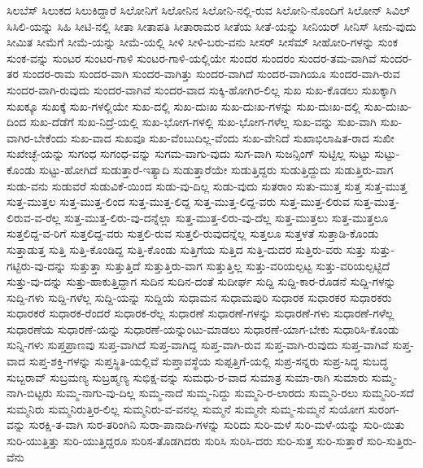 {ಸಿಲಬೆಸ್
ಸಿಲುಕದ
ಸಿಲುಕಿದ್ದಾರೆ
ಸಿಲೋನಿಗೆ
ಸಿಲೋನಿನ
ಸಿಲೋನಿ-ನಲ್ಲಿ-ರುವ
ಸಿಲೋನಿ-ನೊಂದಿಗೆ
ಸಿಲೋನ್
ಸಿವಿಲ್
ಸಿಸಿಲಿ-ಯನ್ನು
ಸಿಹಿ
ಸೀಟಿ-ನಲ್ಲಿ
ಸೀತಾ
ಸೀತಾಪತಿ
ಸೀತಾರಾಮರ
ಸೀತೆಯ
ಸೀತೆ-ಯನ್ನು
ಸೀನಿಯರ್
ಸೀನಿಸ್
ಸೀನು-ವುದು
ಸೀಮಿತ
ಸೀಮೆಗೆ
ಸೀಮೆ-ಯನ್ನು
ಸೀಮೆ-ಯಲ್ಲಿ
ಸೀಳಿ
ಸೀಳಿ-ಬರು-ವನು
ಸೀಸರ್
ಸೀಸೆಮ್
ಸೀಹೋರಿ-ಗಳನ್ನು
ಸುಂಕ
ಸುಂಕ-ವನ್ನು
ಸುಂಟರ
ಸುಂಟರ-ಗಾಳಿ
ಸುಂಟರ-ಗಾಳಿ-ಯಲ್ಲಿಯೇ
ಸುಂದರ
ಸುಂದರಂ
ಸುಂದರ-ತಮ-ವಾಗಿವೆ
ಸುಂದರ-ತರ
ಸುಂದರ-ರಾಮ
ಸುಂದರ-ವಾಗಿ
ಸುಂದರ-ವಾಗಿತ್ತು
ಸುಂದರ-ವಾಗಿದೆ
ಸುಂದರ-ವಾಗಿಯೂ
ಸುಂದರ-ವಾಗಿ-ರುವ
ಸುಂದರ-ವಾಗಿ-ರುವುದು
ಸುಂದರ-ವಾಗಿವೆ
ಸುಂದರ-ವಾದ
ಸುಕ್ಕಿ-ಹೋಗಿರ-ಲಿಲ್ಲ
ಸುಖ
ಸುಖ-ಕೊಡಲು
ಸುಖಕ್ಕಾಗಿ
ಸುಖಕ್ಕೂ
ಸುಖಕ್ಕೆ
ಸುಖ-ಗಳಲ್ಲಿಯೇ
ಸುಖ-ದಲ್ಲಿ
ಸುಖ-ದುಃಖ
ಸುಖ-ದುಃಖ-ಗಳನ್ನು
ಸುಖ-ದುಃಖ-ದಲ್ಲಿ
ಸುಖ-ದುಃಖ-ದಿಂದ
ಸುಖ-ದೆಡೆಗೆ
ಸುಖ-ನಿದ್ರೆ-ಯಲ್ಲಿ
ಸುಖ-ಭೋಗ-ಗಳಲ್ಲಿ
ಸುಖ-ಭೋಗ-ಗಳೆಲ್ಲ
ಸುಖ-ವನ್ನು
ಸುಖ-ವಾಗಿ
ಸುಖ-ವಾಗಿರ-ಬೇಕೆಂದು
ಸುಖ-ವಾದ
ಸುಖವೂ
ಸುಖ-ವೆಂಬುದಿಲ್ಲ-ವೆಂದು
ಸುಖ-ವೇನಿದೆ
ಸುಖಾಭಿಲಾಷಿತ-ರಾದ
ಸುಖೀ
ಸುಖೇಚ್ಛೆ-ಯನ್ನು
ಸುಗಂಧ
ಸುಗಂಧ-ವನ್ನು
ಸುಗಮ-ವಾಗು-ವುದು
ಸುಗ-ವಾಗಿ
ಸುಜನ್ಸಿಂಗ್
ಸುಟ್ಟಿಲ್ಲ
ಸುಟ್ಟು
ಸುಟ್ಟು-ಕೊಂಡು
ಸುಟ್ಟು-ಹೋಗಿದೆ
ಸುಡುತ್ತಾರೆ-ಇತ್ಯಾದಿ
ಸುಡುತ್ತಾರೆಯೇ
ಸುಡುತ್ತಿದ್ದರು
ಸುಡುತ್ತಿದ್ದುದು
ಸುಡುತ್ತಿರು-ವಾಗ
ಸುಡು-ವನು
ಸುಡುವರೆ
ಸುಡುವಿಕೆ-ಯಿಂದ
ಸುಡು-ವು-ದಿಲ್ಲ
ಸುಡು-ವುದು
ಸುತರಾಂ
ಸುತು-ಮುತ್ತ
ಸುತ್ತ
ಸುತ್ತ-ಮುತ್ತ
ಸುತ್ತ-ಮುತ್ತಲ
ಸುತ್ತ-ಮುತ್ತ-ಲಿಂದ
ಸುತ್ತ-ಮುತ್ತ-ಲಿದ್ದ
ಸುತ್ತ-ಮುತ್ತ-ಲಿದ್ದ-ವರು
ಸುತ್ತ-ಮುತ್ತ-ಲಿರುವ
ಸುತ್ತ-ಮುತ್ತ-ಲಿರುವ-ವ-ರೆಲ್ಲ
ಸುತ್ತ-ಮುತ್ತ-ಲಿರು-ವು-ದನ್ನೆಲ್ಲಾ
ಸುತ್ತ-ಮುತ್ತ-ಲಿರು-ವು-ದೆಲ್ಲ
ಸುತ್ತ-ಮುತ್ತಲು
ಸುತ್ತ-ಮುತ್ತಲೂ
ಸುತ್ತಲಿದ್ದ-ವ-ರಿಗೆ
ಸುತ್ತಲಿದ್ದ-ವರು
ಸುತ್ತಲಿ-ರುವ
ಸುತ್ತಲಿ-ರುವುದನ್ನೆಲ್ಲ
ಸುತ್ತಲೂ
ಸುತ್ತಳತೆ
ಸುತ್ತಾಡಿ-ಕೊಂಡು
ಸುತ್ತಾಡುತ್ತ
ಸುತ್ತಿ
ಸುತ್ತಿ-ಕೊಂಡಿದ್ದ
ಸುತ್ತಿ-ಕೊಂಡು
ಸುತ್ತಿಗೆಯ
ಸುತ್ತಿದ
ಸುತ್ತಿ-ದುದರ
ಸುತ್ತಿರು-ವರು
ಸುತ್ತು
ಸುತ್ತು-ಗಟ್ಟಿರು-ವು-ದನ್ನು
ಸುತ್ತುತ್ತಾ
ಸುತ್ತುತ್ತಿದೆ
ಸುತ್ತುತ್ತಿರು-ವಾಗ
ಸುತ್ತುತ್ತಿಲ್ಲ
ಸುತ್ತು-ವರಿಯಲ್ಪಟ್ಟ
ಸುತ್ತು-ವರಿಯಲ್ಪಟ್ಟಿದೆ
ಸುತ್ತು-ವು-ದನ್ನು
ಸುತ್ತು-ಹಾಕುತ್ತಿದ್ದಾಗ
ಸುದಿನ
ಸುದಿನ-ದಂತೆ
ಸುದೀರ್ಘ
ಸುದ್ದಿ
ಸುದ್ದಿ-ಕಾರ-ರೊಡನೆ
ಸುದ್ದಿ-ಗಳನ್ನು
ಸುದ್ದಿ-ಗಳು
ಸುದ್ದಿ-ಗಳೆಲ್ಲ
ಸುದ್ದಿ-ಯನ್ನು
ಸುದ್ದಿಯೆ
ಸುಧಾಮನ
ಸುಧಾಮಪುರಿ
ಸುಧಾರಕ
ಸುಧಾರಕರ
ಸುಧಾರಕರು
ಸುಧಾರಕರೆ
ಸುಧಾರಕ-ರೆಂದರೆ
ಸುಧಾರಕ-ರೆಲ್ಲ
ಸುಧಾರಣೆ
ಸುಧಾರಣೆ-ಗಳನ್ನು
ಸುಧಾರಣೆ-ಗಳು
ಸುಧಾರಣೆ-ಗಳೆಲ್ಲ
ಸುಧಾರಣೆಯ
ಸುಧಾರಣೆ-ಯನ್ನು
ಸುಧಾರಣೆ-ಯನ್ನುಂಟು-ಮಾಡಲು
ಸುಧಾರಣೆ-ಯಾಗ-ಬೇಕು
ಸುಧಾರಿಸಿ-ಕೊಂಡು
ಸುನ್ನಿ-ಗಳು
ಸುಪ್ತಪ್ರಾಣವು
ಸುಪ್ತ-ವಾಗಿದೆ
ಸುಪ್ತ-ವಾಗಿದ್ದ
ಸುಪ್ತ-ವಾಗಿ-ರುವ
ಸುಪ್ತ-ವಾಗಿ-ರುವುದು
ಸುಪ್ತ-ವಾಗಿವೆ
ಸುಪ್ತ-ವಾದ
ಸುಪ್ತ-ಶಕ್ತಿ-ಗಳನ್ನು
ಸುಪ್ತಸ್ಥಿತಿ-ಯಲ್ಲಿವೆ
ಸುಪ್ತಾವಸ್ಥೆಯ
ಸುಪ್ಪತ್ತಿಗೆ-ಯಲ್ಲಿ
ಸುಪ್ರ-ಸನ್ನರು
ಸುಪ್ರ-ಸಿದ್ಧ
ಸುಬದ್ಧ
ಸುಬ್ಬರಾವ್
ಸುಬ್ರಮಣ್ಯ
ಸುಬ್ರಹ್ಮಣ್ಯ
ಸುಭಿಕ್ಷ-ವನ್ನು
ಸುಮಧು-ರ-ವಾದ
ಸುಮಾತ್ರ
ಸುಮಾ-ರಾಗಿ
ಸುಮಾರು
ಸುಮ್ಮ-ನಾಗಿ-ಬಿಟ್ಟರು
ಸುಮ್ಮ-ನಾಗು-ವು-ದಿಲ್ಲ
ಸುಮ್ಮ-ನಾದೆ
ಸುಮ್ಮ-ನಿದ್ದು
ಸುಮ್ಮನಿ-ರ-ಲಾರದು
ಸುಮ್ಮನಿ-ರಲು
ಸುಮ್ಮನಿರಿ-ಸದೆ
ಸುಮ್ಮನಿರು
ಸುಮ್ಮನಿರುತ್ತಿರ-ಲಿಲ್ಲ
ಸುಮ್ಮನಿರು-ವ-ವನಲ್ಲ
ಸುಮ್ಮನೆ
ಸುಮ್ಮನೇ
ಸುಮ್ಮ-ಸುಮ್ಮನೆ
ಸುಯೋಗ
ಸುರಂಗ-ವನ್ನು
ಸುರಕ್ಷಿ-ತ-ವಾಗಿ
ಸುರ-ತರಿಂಗಿನಿ
ಸುರಾ-ಪಾನಾದಿ-ಗಳನ್ನು
ಸುರಿದು
ಸುರಿ-ಮಳೆ
ಸುರಿ-ಮಳೆ-ಯನ್ನು
ಸುರಿ-ಯಿತು
ಸುರಿ-ಯುತ್ತಿತ್ತು
ಸುರಿ-ಯುತ್ತಿದ್ದರೂ
ಸುರಿಸ-ತೊಡಗಿದರು
ಸುರಿಸಿ
ಸುರಿಸಿ-ದರು
ಸುರಿ-ಸುತ್ತ
ಸುರಿ-ಸುತ್ತಾರೆ
ಸುರಿ-ಸುತ್ತಿರು-ವೆನು
}
